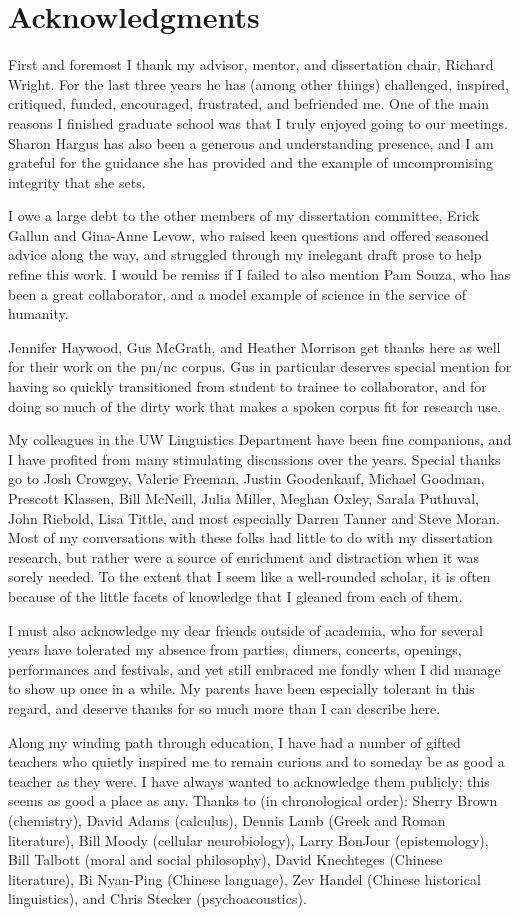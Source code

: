 \chapter*{Acknowledgments}
First and foremost I thank my advisor, mentor, and dissertation chair, Richard Wright.  For the last three years he has (among other things) challenged, inspired, critiqued, funded, encouraged, frustrated, and befriended me.  One of the main reasons I finished graduate school was that I truly enjoyed going to our meetings.  Sharon Hargus has also been a generous and understanding presence, and I am grateful for the guidance she has provided and the example of uncompromising integrity that she sets.

I owe a large debt to the other members of my dissertation committee, Erick Gallun and Gina-Anne Levow, who raised keen questions and offered seasoned advice along the way, and struggled through my inelegant draft prose to help refine this work.  I would be remiss if I failed to also mention Pam Souza, who has been a great collaborator, and a model example of science in the service of humanity.  

Jennifer Haywood, Gus McGrath, and Heather Morrison get thanks here as well for their work on the \ac{pn/nc} corpus.  Gus in particular deserves special mention for having so quickly transitioned from student to trainee to collaborator, and for doing so much of the dirty work that makes a spoken corpus fit for research use.

My colleagues in the UW Linguistics Department have been fine companions, and I have profited from many stimulating discussions over the years.  Special thanks go to Josh Crowgey, Valerie Freeman, Justin Goodenkauf, Michael Goodman, Prescott Klassen, Bill McNeill, Julia Miller, Meghan Oxley, Sarala Puthuval, John Riebold, Lisa Tittle, and most especially Darren Tanner and Steve Moran.  Most of my conversations with these folks had little to do with my dissertation research, but rather were a source of enrichment and distraction when it was sorely needed.  To the extent that I seem like a well-rounded scholar, it is often because of the little facets of knowledge that I gleaned from each of them.  

I must also acknowledge my dear friends outside of academia, who for several years have tolerated my absence from parties, dinners, concerts, openings, performances and festivals, and yet still embraced me fondly when I did manage to show up once in a while.  My parents have been especially tolerant in this regard, and deserve thanks for so much more than I can describe here.

Along my winding path through education, I have had a number of gifted teachers who quietly inspired me to remain curious and to someday be as good a teacher as they were.  I have always wanted to acknowledge them publicly; this seems as good a place as any.  Thanks to (in chronological order): Sherry Brown (chemistry), David Adams (calculus), Dennis Lamb (Greek and Roman literature), Bill Moody (cellular neurobiology), Larry BonJour (epistemology), Bill Talbott (moral and social philosophy), David Knechteges (Chinese literature), Bi Nyan-Ping (Chinese language), Zev Handel (Chinese historical linguistics), and Chris Stecker (psychoacoustics).
